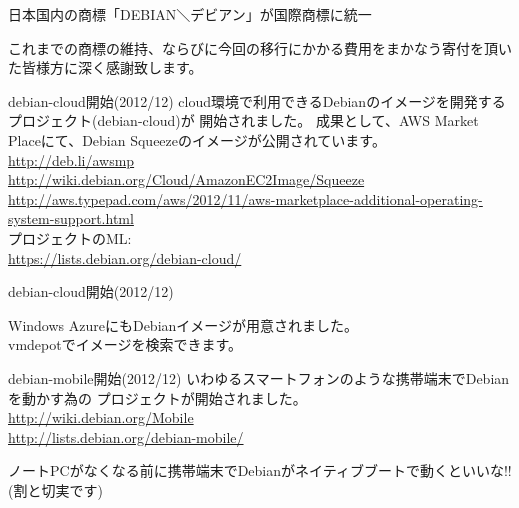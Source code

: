 \begin{frame}{日本国内の商標「DEBIAN＼デビアン」が国際商標に統一}
\begin{center}
\Large
これまでの商標の維持、ならびに今回の移行にかかる費用をまかなう寄付を頂いた皆様方に深く感謝致します。
\end{center}
\end{frame}

\begin{frame}{debian-cloud開始(2012/12)}
cloud環境で利用できるDebianのイメージを開発するプロジェクト(debian-cloud)が
開始されました。
成果として、AWS Market Placeにて、Debian Squeezeのイメージが公開されています。\\
\url{http://deb.li/awsmp}\\
\url{http://wiki.debian.org/Cloud/AmazonEC2Image/Squeeze}\\
\url{http://aws.typepad.com/aws/2012/11/aws-marketplace-additional-operating-system-support.html}\\
プロジェクトのML:\\
\url{https://lists.debian.org/debian-cloud/}
\end{frame}

\begin{frame}{debian-cloud開始(2012/12)}

\begin{center}
\Large
Windows AzureにもDebianイメージが用意されました。\\
vmdepotでイメージを検索できます。
\end{center}
\end{frame}


\begin{frame}{debian-mobile開始(2012/12)}
いわゆるスマートフォンのような携帯端末でDebianを動かす為の
プロジェクトが開始されました。\\
\url{http://wiki.debian.org/Mobile}\\
\url{http://lists.debian.org/debian-mobile/}
\begin{center}
\Large ノートPCがなくなる前に携帯端末でDebianがネイティブブートで動くといいな!!\\(割と切実です)
\end{center}
\end{frame}



